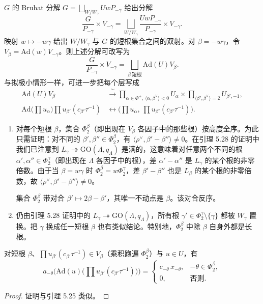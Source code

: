 $G$ 的 Bruhat 分解 $G=\bigsqcup_{W/W_\gamma}UwP_{-\gamma}$ 给出分解
\[
\frac{G}{P_{-\gamma}}\times V_{-\gamma}=\bigsqcup_{W/W_\gamma}\frac{UwP_{-\gamma}}{P_{-\gamma}}\times V_{-\gamma}.
\]
映射 $w\mapsto-w\gamma$ 给出 $W/W_\gamma$ 与 $G$ 的短根集合之间的双射。对 $\beta=-w\gamma$，令 $V_\beta=\mathrm{Ad}(w)V_{-\gamma}$。则上述分解可改写为
\begin{equation}
\frac{G}{P_{-\gamma}}\times V_{-\gamma}=\bigsqcup_{\beta\ \text{短根}}\mathrm{Ad}(U)V_\beta.
\end{equation}
与拟极小情形一样，可进一步把每个层写成
\begin{equation}
\begin{aligned}
\mathrm{Ad}(U)V_\beta&\xrightarrow{\ \sim\ }\prod_{\alpha\in\Phi^+,\ \langle\alpha,\beta^\vee\rangle<0}U_\alpha\times\prod_{\langle\beta',\beta^\vee\rangle=2}U_{\beta',-1},\\
\mathrm{Ad}\Big(\prod u_\alpha\Big)\prod u_{\beta'}(c_{\beta'}\tau^{-1})&\leftrightarrow\Big(\prod u_\alpha,\ \prod u_{\beta'}(c_{\beta'}\tau^{-1})\Big).
\end{aligned}
\end{equation}

\begin{remark}
\begin{enumerate}[label=(\arabic*), leftmargin=1.9em, itemsep=.2em]
\item 对每个短根 $\beta$，集合 $\Phi^\beta_2$（即出现在 $V_\beta$ 各因子中的那些根）按高度全序。为此只需证明：对不同的 $\beta',\beta''\in\Phi^\beta_2$，有 $\langle\rho^\vee,\beta'-\beta''\rangle\neq 0$。在引理 5.28 的证明中我们已注意到 $L_\gamma\twoheadrightarrow\mathrm{GO}(\Lambda,q_\Lambda)$ 是满的，这意味着对任意两个不同的根 $\alpha',\alpha''\in\Phi^\gamma_2$（即出现在 $\Lambda$ 各因子中的根），差 $\alpha'-\alpha''$ 是 $L_\gamma$ 的某个根的非零倍数。由于当 $\beta=w\gamma$ 时 $\Phi^\beta_2=w\Phi^\gamma_2$，差 $\beta'-\beta''$ 也是 $L_\beta$ 的某个根的非零倍数，故 $\langle\rho^\vee,\beta'-\beta''\rangle\neq 0$。

集合 $\Phi^\beta_2$ 带对合 $\beta'\mapsto 2\beta-\beta'$，其唯一不动点是 $\beta$。该对合反序。
\item 仍由引理 5.28 证明中的 $L_\gamma\twoheadrightarrow\mathrm{GO}(\Lambda,q_\Lambda)$，所有根 $\gamma'\in\Phi^\gamma_2\setminus\{\gamma\}$ 都被 $W_\gamma$ 置换。把 $\gamma$ 换成任一短根 $\beta$ 也有类似结论。特别地，$\Phi^\beta_2$ 中除 $\beta$ 自身外都是长根。
\end{enumerate}
\end{remark}

\begin{lemma}
对短根 $\beta$、$\prod u_{\beta'}(c_{\beta'}\tau^{-1})\in V_\beta$（乘积跑遍 $\Phi^\beta_2$）与 $u\in U$，有
\[
a_{-\theta}\Big(\mathrm{Ad}(u)\big(\prod u_{\beta'}(c_{\beta'}\tau^{-1})\big)\Big)=
\begin{cases}
c_{-\theta}\,x_{-\theta},&-\theta\in\Phi^\beta_2,\\
0,&\text{否则}.
\end{cases}
\]
\end{lemma}

\begin{proof}
证明与引理 5.25 类似。
\end{proof}
